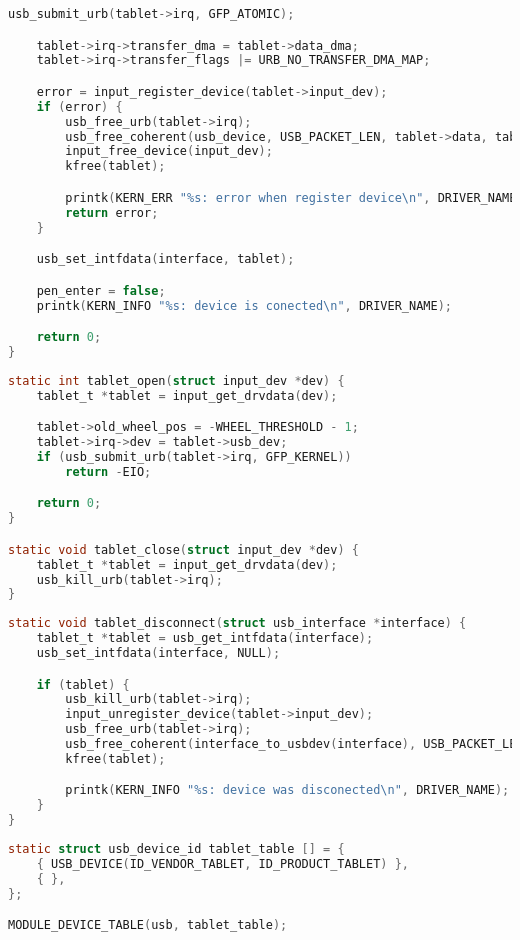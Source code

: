 \begin{lstlisting}[language=c,caption=Функция подключения планшета,label=lst:probe]
    usb_submit_urb(tablet->irq, GFP_ATOMIC);

    tablet->irq->transfer_dma = tablet->data_dma;
    tablet->irq->transfer_flags |= URB_NO_TRANSFER_DMA_MAP;

    error = input_register_device(tablet->input_dev);
    if (error) {
        usb_free_urb(tablet->irq);
        usb_free_coherent(usb_device, USB_PACKET_LEN, tablet->data, tablet->data_dma);
        input_free_device(input_dev);
        kfree(tablet);

        printk(KERN_ERR "%s: error when register device\n", DRIVER_NAME);
        return error;
    }

    usb_set_intfdata(interface, tablet);

    pen_enter = false;
    printk(KERN_INFO "%s: device is conected\n", DRIVER_NAME);

    return 0;
}
\end{lstlisting}

\begin{lstlisting}[language=c,caption=Функции открытия и закрытия устройства ввода,label=lst:input_dev_open_close]
static int tablet_open(struct input_dev *dev) {
    tablet_t *tablet = input_get_drvdata(dev);

    tablet->old_wheel_pos = -WHEEL_THRESHOLD - 1;
    tablet->irq->dev = tablet->usb_dev;
    if (usb_submit_urb(tablet->irq, GFP_KERNEL))
        return -EIO;

    return 0;
}

static void tablet_close(struct input_dev *dev) {
    tablet_t *tablet = input_get_drvdata(dev);
    usb_kill_urb(tablet->irq);
}
\end{lstlisting}

\begin{lstlisting}[language=c,caption=Функция отключения планшета,label=lst:disconnect]
static void tablet_disconnect(struct usb_interface *interface) {
    tablet_t *tablet = usb_get_intfdata(interface);
    usb_set_intfdata(interface, NULL);

    if (tablet) {
        usb_kill_urb(tablet->irq);
        input_unregister_device(tablet->input_dev);
        usb_free_urb(tablet->irq);
        usb_free_coherent(interface_to_usbdev(interface), USB_PACKET_LEN, tablet->data, tablet->data_dma);
        kfree(tablet);

        printk(KERN_INFO "%s: device was disconected\n", DRIVER_NAME);
    }
}
\end{lstlisting}

\begin{lstlisting}[language=c,caption=Таблицы подключаемых устройств,label=lst:device_id]
static struct usb_device_id tablet_table [] = {
    { USB_DEVICE(ID_VENDOR_TABLET, ID_PRODUCT_TABLET) },
    { },
};

MODULE_DEVICE_TABLE(usb, tablet_table);
\end{lstlisting}

